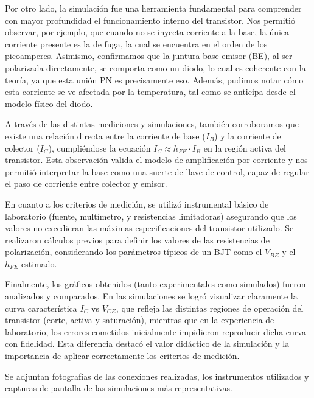 \documentclass[chaptersright]{informeutn}
\begin{document}
  Por otro lado, la simulación fue una herramienta fundamental para comprender con mayor profundidad el funcionamiento 
  interno del transistor. Nos permitió observar, por ejemplo, que cuando no se inyecta corriente a la base, la única 
  corriente presente es la de fuga, la cual se encuentra en el orden de los picoamperes. Asimismo, confirmamos que la 
  juntura base-emisor (BE), al ser polarizada directamente, se comporta como un diodo, lo cual es coherente con la 
  teoría, ya que esta unión PN es precisamente eso. Además, pudimos notar cómo esta corriente se ve afectada por la 
  temperatura, tal como se anticipa desde el modelo físico del diodo.
  
  A través de las distintas mediciones y simulaciones, también corroboramos que existe una relación directa entre la 
  corriente de base ($I_B$) y la corriente de colector ($I_C$), cumpliéndose la ecuación $I_C \approx h_{FE} \cdot I_B$ 
  en la región activa del transistor. Esta observación valida el modelo de amplificación por corriente y nos permitió 
  interpretar la base como una suerte de llave de control, capaz de regular el paso de corriente entre colector y
  emisor.
  
  En cuanto a los criterios de medición, se utilizó instrumental básico de laboratorio (fuente, multímetro, y 
  resistencias limitadoras) asegurando que los valores no excedieran las máximas especificaciones del transistor 
  utilizado. Se realizaron cálculos previos para definir los valores de las resistencias de polarización, considerando 
  los parámetros típicos de un BJT como el $V_{BE}$ y el $h_{FE}$ estimado.
  
  Finalmente, los gráficos obtenidos (tanto experimentales como simulados) fueron analizados y comparados. En las 
  simulaciones se logró visualizar claramente la curva característica $I_C$ vs $V_{CE}$, que refleja las distintas 
  regiones de operación del transistor (corte, activa y saturación), mientras que en la experiencia de laboratorio, los 
  errores cometidos inicialmente impidieron reproducir dicha curva con fidelidad. Esta diferencia destacó el valor 
  didáctico de la simulación y la importancia de aplicar correctamente los criterios de medición.
  
  Se adjuntan fotografías de las conexiones realizadas, los instrumentos utilizados y capturas de pantalla de las 
  simulaciones más representativas.
\end{document}
